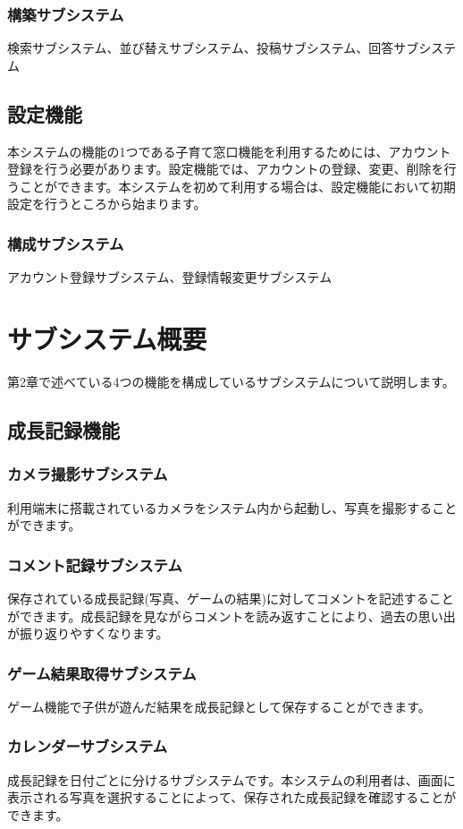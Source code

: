 \documentclass[a4j]{jarticle}
\begin{document}
\subsubsection*{構築サブシステム}
\noindent 検索サブシステム、並び替えサブシステム、投稿サブシステム、回答サブシステム

\subsection{設定機能}
本システムの機能の1つである子育て窓口機能を利用するためには、アカウント登録を行う必要があります。設定機能では、アカウントの登録、変更、削除を行うことができます。本システムを初めて利用する場合は、設定機能において初期設定を行うところから始まります。
\subsubsection*{構成サブシステム}
\noindent アカウント登録サブシステム、登録情報変更サブシステム



\newpage
\section{サブシステム概要}
第2章で述べている4つの機能を構成しているサブシステムについて説明します。

\subsection{成長記録機能}
\subsubsection*{カメラ撮影サブシステム}
利用端末に搭載されているカメラをシステム内から起動し、写真を撮影することができます。
\subsubsection*{コメント記録サブシステム}
保存されている成長記録(写真、ゲームの結果)に対してコメントを記述することができます。成長記録を見ながらコメントを読み返すことにより、過去の思い出が振り返りやすくなります。
\subsubsection*{ゲーム結果取得サブシステム}
ゲーム機能で子供が遊んだ結果を成長記録として保存することができます。
\subsubsection*{カレンダーサブシステム}
成長記録を日付ごとに分けるサブシステムです。本システムの利用者は、画面に表示される写真を選択することによって、保存された成長記録を確認することができます。
\end{document}
